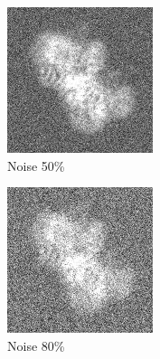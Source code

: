 \documentclass{report}
\begin{document}
\begin{figure}[h]
\begin{subfigure}{.3\textwidth}
\centering
\includegraphics[width=0.8\linewidth]{Emd_4138_proj1_noise_50.jpg}
\captionsetup{justification=centering}
\caption{ Noise 50\% }
\end{subfigure} 
\begin{subfigure}{.27\textwidth}
\centering
\includegraphics[width=0.8\linewidth]{Emd_4138_proj1_noise_80.jpg}
\captionsetup{justification=centering}
\caption{ Noise 80\%}
\end{subfigure}
\begin{subfigure}{.28\textwidth}
\centering

\end{subfigure}
\end{figure}
\end{document}
